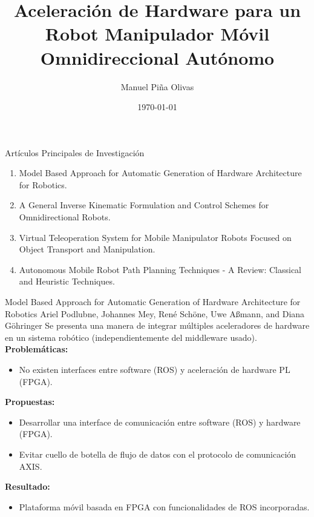 \documentclass[10pt,aspectratio=169]{beamer}
\title[Aceleración de Hardware para un Robot Manipulador Móvil Omnidireccional Autónomo]{Aceleración de Hardware para un Robot Manipulador Móvil Omnidireccional Autónomo}
\author{Manuel Piña Olivas } %
\institute[UACJ] %
{\noindent
  Asesor de Tésis\\%
  Dr. Franceso José García Luna\\
}
\date{\dmydate\today} %
\begin{document}
{
  \begin{frame}
    \titlepage
   \end{frame}
}

\begin{frame}{Artículos Principales de Investigación}
  \begin{enumerate}
      \item Model Based Approach for Automatic Generation of Hardware Architecture for Robotics.
      \item A General Inverse Kinematic Formulation and Control Schemes for Omnidirectional Robots.
      \item Virtual Teleoperation System for Mobile Manipulator Robots Focused on Object Transport and Manipulation.
      \item Autonomous Mobile Robot Path Planning Techniques - A Review: Classical and Heuristic Techniques.
  \end{enumerate}
\end{frame}

\begin{frame}{Model Based Approach for Automatic Generation of Hardware Architecture for Robotics \scriptsize{Ariel Podlubne, Johannes Mey, René Schöne, Uwe Aßmann, and Diana Göhringer}}
  Se presenta una manera de integrar múltiples aceleradores de hardware en un sistema robótico (independientemente del middleware usado).\\[5pt]
  
  \textbf{Problemáticas:}
  \begin{itemize}
    \item No existen interfaces entre software (ROS) y aceleración de hardware PL (FPGA).
  \end{itemize}

  \textbf{Propuestas:}
  \begin{itemize}
    \item Desarrollar una interface de comunicación entre software (ROS) y hardware (FPGA).
    \item Evitar cuello de botella de flujo de datos con el protocolo de comunicación AXIS.
  \end{itemize}

  \textbf{Resultado:}
  \begin{itemize}
    \item Plataforma móvil basada en FPGA con funcionalidades de ROS incorporadas.
  \end{itemize}
\end{frame}
\end{document}

